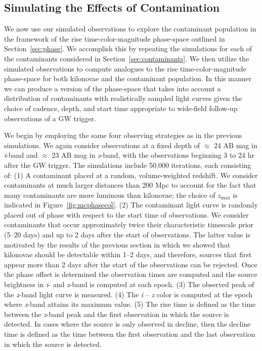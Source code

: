 \subsection{Simulating the Effects of Contamination}
\label{sec:MCsims_cont}
   
We now use our simulated observations to explore the contaminant population in the framework of the rise time-color-magnitude phase-space outlined in Section~\ref{sec:phase}. We accomplish this by repeating the simulations for each of the contaminants considered in Section~\ref{sec:contaminants}. We then utilize the simulated observations to compute analogues to the rise time-color-magnitude phase-space for both kilonovae and the contaminant population. In this manner we can produce a version of the phase-space that takes into account a distribution of contaminants with realistically sampled light curves given the choice of cadence, depth, and start time appropriate to wide-field follow-up observations of a GW trigger.
      
We begin by employing the same four observing strategies as in the previous simulations. We again consider observations at a fixed depth of $\approx$ 24 AB mag in {\em i}-band and $\approx$ 23 AB mag in {\em z}-band, with the observations beginning 3 to 24 hr after the GW trigger. The simulations include 50,000 iterations, each consisting of: (1) A contaminant placed at a random, volume-weighted redshift. We consider contaminants at much larger distances than 200 Mpc to account for the fact that many contaminants are more luminous than kilonovae; the choice of $z_{\text{max}}$ is indicated in Figure~\ref{fig:mcphasecol}. (2) The contaminant light curve is randomly placed out of phase with respect to the start time of observations. We consider contaminants that occur approximately twice their characteristic timescale prior (5--20 days) and up to 2 days after the start of observations. The latter value is motivated by the results of the previous section in which we showed that kilonovae should be detectable within 1--2 days, and therefore, sources that first appear more than 2 days after the start of the observations can be rejected. Once the phase offset is determined the observation times are computed and the source brightness in {\em i}- and {\em z}-band is computed at each epoch. (3) The observed peak of the {\em z}-band light curve is measured. (4) The {\em i} -- {\em z} color is computed at the epoch where {\em z}-band attains its maximum value. (5) The rise time is defined as the time between the {\em z}-band peak and the first observation in which the source is detected. In cases where the source is only observed in decline, then the decline time is defined as the time between the first observation and the last observation in which the source is detected. 
 
